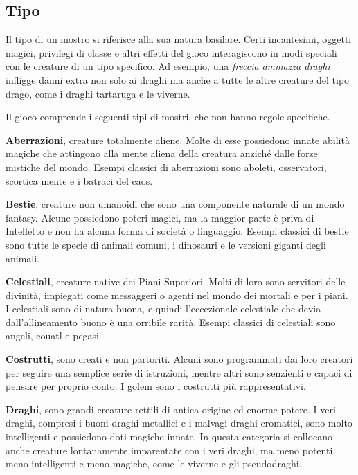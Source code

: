 \begin{multicols}{2}
\subsection{Tipo}

Il tipo di un mostro si riferisce alla sua natura basilare. Certi incantesimi, oggetti magici, privilegi di classe e altri effetti del gioco interagiscono in modi speciali con le creature di un tipo specifico. Ad esempio, una \emph{freccia} \emph{ammazza draghi} infligge danni extra non solo ai draghi ma anche a tutte le altre creature del tipo drago, come i draghi tartaruga e le viverne.

Il gioco comprende i seguenti tipi di mostri, che non hanno regole specifiche.

\medskip\textbf{Aberrazioni}, creature totalmente aliene. Molte di esse possiedono innate abilità magiche che attingono alla mente aliena della creatura anziché dalle forze mistiche del mondo. Esempi classici di aberrazioni sono aboleti, osservatori, scortica mente e i batraci del caos.

\medskip\textbf{Bestie}, creature non umanoidi che sono una componente naturale di un mondo fantasy. Alcune possiedono poteri magici, ma la maggior parte è priva di Intelletto e non ha alcuna forma di società o linguaggio. Esempi classici di bestie sono tutte le specie di animali comuni, i dinosauri e le versioni giganti degli animali. 

\medskip\textbf{Celestiali}, creature native dei Piani Superiori. Molti di loro sono servitori delle divinità, impiegati come messaggeri o agenti nel mondo dei mortali e per i piani.\\
I celestiali sono di natura buona, e quindi l'eccezionale celestiale che devia dall'allineamento buono è una orribile rarità. Esempi classici di celestiali sono angeli, couatl e pegasi.

\medskip\textbf{Costrutti}, sono creati e non partoriti. Alcuni sono programmati dai loro creatori per seguire una semplice serie di istruzioni, mentre altri sono senzienti e capaci di pensare per proprio conto. I golem sono i costrutti più rappresentativi.

\medskip\textbf{Draghi}, sono grandi creature rettili di antica origine ed enorme potere. I veri draghi, compresi i buoni draghi metallici e i malvagi draghi cromatici, sono molto intelligenti e possiedono doti magiche innate. In questa categoria si collocano anche creature lontanamente imparentate con i veri draghi, ma meno potenti, meno intelligenti e meno magiche, come le viverne e gli pseudodraghi.


\end{multicols}
